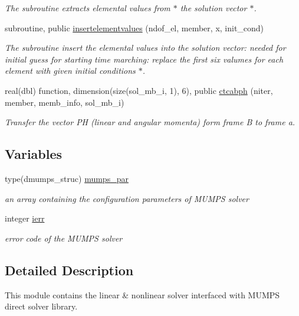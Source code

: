 \begin{DoxyCompactItemize}
\begin{DoxyCompactList}\small\item\em The subroutine extracts elemental values from $\ast$ the solution vector $\ast$. \end{DoxyCompactList}\item 
subroutine, public \hyperlink{namespacesolvemumps_a3c8d285942de4048473a98c26d248fd7}{insertelementvalues} (ndof\+\_\+el, member, x, init\+\_\+cond)
\begin{DoxyCompactList}\small\item\em The subroutine insert the elemental values into the solution vector\+: needed for initial guess for starting time marching\+: replace the first six valumes for each element with given initial conditions $\ast$. \end{DoxyCompactList}\item 
real(dbl) function, dimension(size(sol\+\_\+mb\+\_\+i, 1), 6), public \hyperlink{namespacesolvemumps_a680703eba15a14e08417723cd80080b1}{ctcabph} (niter, member, memb\+\_\+info, sol\+\_\+mb\+\_\+i)
\begin{DoxyCompactList}\small\item\em Transfer the vector PH (linear and angular momenta) form frame B to frame a. \end{DoxyCompactList}\end{DoxyCompactItemize}
\subsection*{Variables}
\begin{DoxyCompactItemize}
\item 
type(dmumps\+\_\+struc) \hyperlink{namespacesolvemumps_ab76b5a7f705b0acb09ebc3ecf7e51f91}{mumps\+\_\+par}
\begin{DoxyCompactList}\small\item\em an array containing the configuration parameters of M\+U\+M\+PS solver \end{DoxyCompactList}\item 
integer \hyperlink{namespacesolvemumps_a5f812a31bb5931d66e5d6bb4c05f4a51}{ierr}
\begin{DoxyCompactList}\small\item\em error code of the M\+U\+M\+PS solver \end{DoxyCompactList}\end{DoxyCompactItemize}


\subsection{Detailed Description}
This module contains the linear \& nonlinear solver interfaced with M\+U\+M\+PS direct solver library. 

